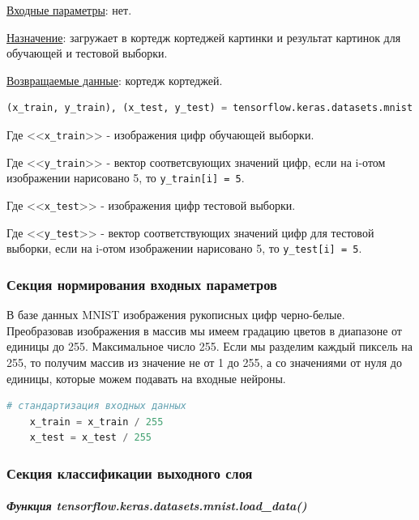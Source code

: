 \underline{Входные параметры}: нет.

\underline{Назначение}: загружает в кортедж кортеджей картинки и результат картинок для обучающей и тестовой выборки.

\underline{Возвращаемые данные}: кортедж кортеджей.

\begin{lstlisting}[language=Python,]
    (x_train, y_train), (x_test, y_test) = tensorflow.keras.datasets.mnist.load_data()
\end{lstlisting}

Где <<\verb|x_train|>> - изображения цифр обучающей выборки.

Где <<\verb|у_train|>> - вектор соответсвующих значений цифр,
если на i-отом изображении нарисовано 5, то \verb|y_train[i] = 5|.

Где <<\verb|x_test|>> - изображения цифр тестовой выборки.

Где <<\verb|у_test|>> - вектор соответствующих значений цифр для тестовой выборки,
если на i-отом изображении нарисовано 5, то \verb|y_test[i] = 5|.



\subsubsection{Секция нормирования входных параметров}

В базе данных MNIST изображения рукописных цифр черно-белые. Преобразовав изображения в массив мы имеем градацию цветов в диапазоне от единицы до 255. Максимальное число 255. Если мы разделим каждый пиксель на 255, то получим массив из значение не от 1 до 255, а со значениями от нуля до единицы, которые можем подавать на входные нейроны.

\begin{lstlisting}[language=Python,]
    # стандартизация входных данных
    x_train = x_train / 255
    x_test = x_test / 255
\end{lstlisting}



\newpage



\subsubsection{Секция классификации выходного слоя}

\subparagraph{Функция tensorflow.keras.datasets.mnist.load\_data()} \hspace{0pt}

